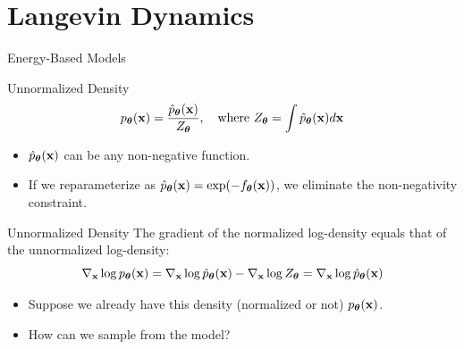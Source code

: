 \documentclass{beamer}
\renewcommand{\eqpause}{}
\begin{document}
\section{Langevin Dynamics}
\begin{frame}{Energy-Based Models}
	\begin{block}{Unnormalized Density}
		\vspace{-0.2cm}
		\[
			p_{\boldsymbol{\theta}}(\mathbf{x}) = \frac{\hat{p}_{\boldsymbol{\theta}}(\mathbf{x})}{Z_{\boldsymbol{\theta}}}, \quad \text{where } Z_{\boldsymbol{\theta}} = \int \hat{p}_{\boldsymbol{\theta}}(\mathbf{x}) d \mathbf{x}
		\]
		\vspace{-0.3cm}
		\begin{itemize}
			\item $\hat{p}_{\boldsymbol{\theta}}(\mathbf{x})$ can be any non-negative function. \\
			\item If we reparameterize as $\hat{p}_{\boldsymbol{\theta}}(\mathbf{x}) = \exp(-f_{\boldsymbol{\theta}}(\mathbf{x}))$, we eliminate the non-negativity constraint.
		\end{itemize}
	\end{block}
	\eqpause
	\vspace{-0.3cm}
	\begin{block}{Unnormalized Density}
		The gradient of the normalized log-density equals that of the unnormalized log-density:
		\[
			\nabla_{\mathbf{x}} \log p_{\boldsymbol{\theta}}(\mathbf{x}) = \nabla_{\mathbf{x}} \log \hat{p}_{\boldsymbol{\theta}}(\mathbf{x}) - \nabla_{\mathbf{x}} \log Z_{\boldsymbol{\theta}} = \nabla_{\mathbf{x}} \log \hat{p}_{\boldsymbol{\theta}}(\mathbf{x})
		\]
	\end{block}
	\eqpause
	\vspace{-0.3cm}
	\begin{itemize}
		\item Suppose we already have this density (normalized or not) $p_{\boldsymbol{\theta}}(\mathbf{x})$.
		\item How can we sample from the model?
	\end{itemize}
\end{frame}
\end{document}
